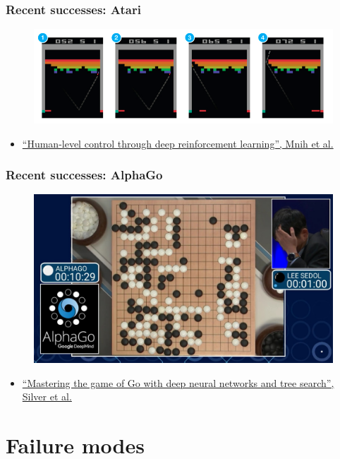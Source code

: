 \documentclass{beamer}
\begin{document}
\begin{frame}
  \frametitle{Recent successes: Atari}

  \begin{figure}
    \includegraphics[width=0.6\linewidth]{img/atari.png}
  \end{figure}
  \begin{itemize}
    \item \href{http://www.nature.com/nature/journal/v518/n7540/full/nature14236.html}{``Human-level control through deep reinforcement learning'', Mnih et al.}
  \end{itemize}
\end{frame}

\begin{frame}
  \frametitle{Recent successes: AlphaGo}

  \begin{figure}
    \includegraphics[width=0.6\linewidth]{img/alphago.jpg}
  \end{figure}
  \begin{itemize}
    \item \href{http://www.nature.com/nature/journal/v518/n7540/full/nature14236.html}{``Mastering the game of Go with deep neural networks and tree search'', Silver et al.}
  \end{itemize}
\end{frame}

\section{Failure modes}
\end{document}
